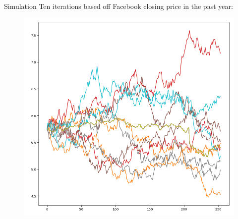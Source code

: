 \documentclass[10pt]{beamer}
\begin{document}
\begin{frame}[t]
\begin{onlyenv}
    \begin{block}{Simulation}
      Ten iterations based off Facebook closing price in the past year:
      \begin{figure}
        \centering
        \includegraphics[width=.5\linewidth]{graphics/monte-carlo.png}
      \end{figure}
    \end{block}
  \end{onlyenv}
\end{frame}
\end{document}
